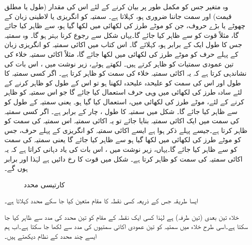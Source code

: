 وہ متغیر جس کو مکمل طور پر بیان کرنے کے لئے اس کی مقدار (طول یا مطلق قیمت) اور سمت جاننا ضروری ہو،   کہلاتا ہے۔ سمتیہ کو انگریزی یا لاطینی زبان کے چھوٹے یا  بڑے حروف،  جن کو موٹے طرز کی لکھائی میں لکھا گیا ہو،  سے ظاہر کیا جائے گا، مثلاً قوت کو  سے ظاہر کیا جائے گا۔یہاں شکل   سے رجوع کرنا بہتر ہو گا۔ وہ سمتیہ جس کا طول ایک کے برابر ہو،  کہلائے گا۔ اس کتاب میں اکائی سمتیہ کو انگریزی زبان کے پہلے حرف کو موٹے طرز کی لکھائی میں لکھا جائے گا، مثلاً اکائی سمتیہ  خلاء کی تین عمودی سمتیات  کو ظاہر کرتے ہیں۔ لکھتے ہوئے، زیر نوشت میں ، اس بات کی نشاندہی  کرتا ہے کہ یہ اکائی سمتیہ خلاء کی  سمت کو ظاہر کرتا ہے۔ اگر کسی سمتیہ  کا طول اور اس کی سمت کو علیحدہ علیحدہ لکھنا ہو تو اس کے طول کو ظاہر کرنے کے لئے سادہ طرز کی لکھائی میں وہی حرف استعمال کیا جائے گا جو اس سمتیہ کو ظاہر کرنے کے لئے، موٹے طرز کی لکھائی میں، استعمال کیا گیا ہو۔ یعنی سمتیہ  کے طول کو  سے ظاہر کیا جائے گا۔ شکل میں سمتیہ   کا طول ، چار کے برابر ہے۔ اگر کسی سمتیہ کی سمت میں ایک اکائی سمتیہ بنایا جائے تو یہ اکائی سمتیہ اس سمتیہ کی سمت کو ظاہر کرتا ہے۔جیسے پہلے ذکر ہوا ہے  ایسے اکائی سمتیہ کو انگریزی کے پہلے حرف،  جس کو موٹے طرز کی لکھائی میں لکھا گیا ہو  سے ظاہر کیا جائے گا یعنی سمتیہ  کی سمت کو  سے ظاہر کیا جائے گا۔یہاں،  زیر نوشت میں  ، اس بات کی یاد دہانی کراتا ہے کہ یہ اکائی سمتیہ  کی سمت کو ظاہر کرتا ہے۔ شکل  میں قوت  کا رخ دائیں  ہے لہٰذا   اور   برابر ہوں گے۔
\begin{figure}
\centering
%
\caption{کارتیسی محدد}
\label{شکل_حقائق_اکائی_سمتیہ}
\end{figure}
%
ایسا طریقہ جس کے ذریعہ کسی نقطہ کا مقام متعین کیا جا سکے محدد کہلاتا ہے۔

خلاء  تین بعدی (تین طرفہ)  ہے لہٰذا  کسی ایک نقطہ کے مقام کو تین محدد کی مدد سے ظاہر کیا جا سکتا ہے۔اسی طرح  خلاء میں سمتیہ کو تین عمودی اکائی سمتیوں کی مدد سے لکھا جا سکتا ہے۔اب ہم ایسے چند محدد کے نظام دیکھتے ہیں۔


